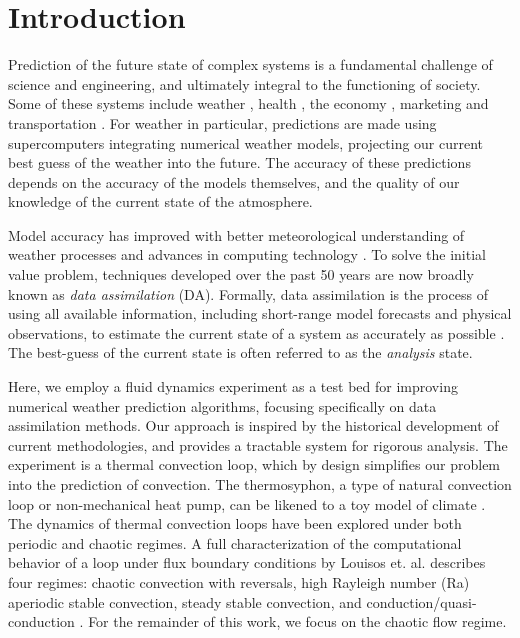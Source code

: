 \section{Introduction}

Prediction of the future state of complex systems is a fundamental challenge of science and engineering, and ultimately integral to the functioning of society.
Some of these systems include weather \cite{weather-violence2013}, health \cite{ginsberg2008detecting}, the economy \cite{sornette2006predictability}, marketing \cite{asur2010predicting} and transportation \cite{savely1972}.
For weather in particular, predictions are made using supercomputers integrating numerical weather models, projecting our current best guess of the weather into the future.
The accuracy of these predictions depends on the accuracy of the models themselves, and the quality of our knowledge of the current state of the atmosphere.

Model accuracy has improved with better meteorological understanding of weather processes and advances in computing technology \cite{bauer2015quiet}.
To solve the initial value problem, techniques developed over the past 50 years are now broadly known as {\em data assimilation} (DA).
Formally, data assimilation is the process of using all available information, including short-range model forecasts and physical observations, to estimate the current state of a system as accurately as possible \cite{yang2006}.
The best-guess of the current state is often referred to as the {\em analysis} state.

Here, we employ a fluid dynamics experiment as a test bed for improving numerical weather prediction algorithms, focusing specifically on data assimilation methods.
Our approach is inspired by the historical development of current methodologies, and provides a tractable system for rigorous analysis.
The experiment is a thermal convection loop, which by design simplifies our problem into the prediction of convection.
The thermosyphon, a type of natural convection loop or non-mechanical heat pump, can be likened to a toy model of climate \cite{harris2011predicting}.
The dynamics of thermal convection loops have been explored under both periodic \cite{keller1966} and chaotic \cite{welander1967,creveling1975stability,gorman1984,gorman1986,ehrhard1990dynamical,yuen1999,jiang2003,burroughs2005reduced,desrayaud2006numerical,yang2006,ridouane2010} regimes.
A full characterization of the computational behavior of a loop under flux boundary conditions by Louisos et. al. describes four regimes: chaotic convection with reversals, high Rayleigh number (Ra) aperiodic stable convection, steady stable convection, and conduction/quasi-conduction \cite{louisos2013}.
For the remainder of this work, we focus on the chaotic flow regime.

